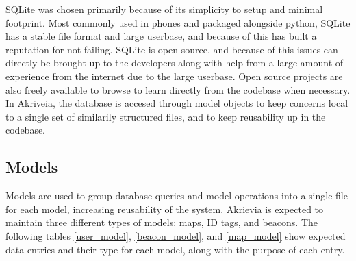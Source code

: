 \bigskip
SQLite was chosen primarily because of its simplicity to setup and minimal footprint.
Most commonly used in phones and packaged alongside python, SQLite has a stable file format and large userbase, and because of this has built a reputation for not failing.
SQLite is open source, and because of this issues can directly be brought up to the developers along with help from a large amount of experience from the internet due to the large userbase.
Open source projects are also freely available to browse to learn directly from the codebase when necessary.
In Akriveia, the database is accesed through model objects to keep concerns local to a single set of similarily structured files, and to keep reusability up in the codebase.

\medskip
\subsection{Models}
Models are used to group database queries and model operations into a single file for each model, increasing reusability of the system.
Akrievia is expected to maintain three different types of models: maps, ID tags, and beacons. The following tables \ref{user_model}, \ref{beacon_model}, and \ref{map_model} show expected data entries and their type for each model, along with the purpose of each entry.


